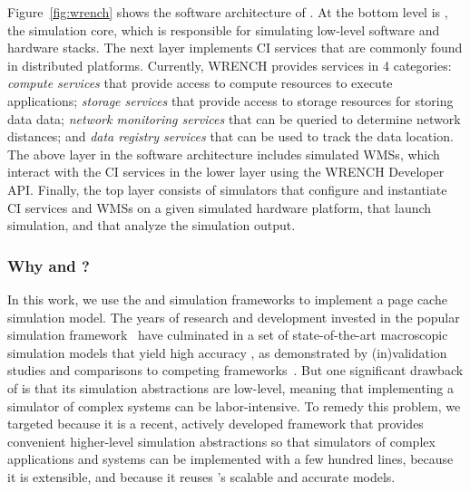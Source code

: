 Figure~\ref{fig:wrench} shows the software architecture of \wrench. 
At the bottom level is \simgrid, the simulation core, which is responsible for 
simulating low-level software and hardware stacks.
The next layer implements CI  services that are commonly
found in distributed platforms.
Currently, WRENCH provides services in 4 categories: 
\textit{compute services} that provide access to compute resources to 
execute applications; 
\textit{storage services} that provide access to storage resources for 
storing data data; 
\textit{network monitoring services} that can be queried to
determine network distances; and 
\textit{data registry services} that can be used to track the data location.
The above layer in the software architecture includes simulated WMSs, 
which interact with the CI services in the lower layer using the WRENCH 
Developer API.
Finally, the top layer consists of simulators that configure and instantiate 
CI services and WMSs on a given simulated hardware platform, that launch
simulation, and that analyze the simulation output.

\subsubsection{Why \simgrid and \wrench?}

In this work, we use the \simgrid and \wrench simulation
frameworks to implement a page cache simulation model.  
The years of research and development invested in
the popular \simgrid simulation framework~\cite{casanova2014simgrid} have
culminated in a set of state-of-the-art macroscopic simulation
models that yield high accuracy , as demonstrated by
(in)validation studies and comparisons to competing
frameworks~\cite{smpi_validity, velhoTOMACS2013, simutool_09,
nstools_07, lebre2015, pouilloux:hal-01197274,
smpi_tpds2017,  7885814, 8048921, 7384330}.  
But one significant drawback of \simgrid is that its simulation
abstractions are low-level, meaning that implementing a
simulator of complex systems can be labor-intensive. 
To remedy this problem, we targeted \wrench because it is a recent,
actively developed framework that provides convenient higher-level 
simulation abstractions so that simulators of complex applications and
systems can be implemented with a few hundred lines, because it is extensible, 
and because it reuses \simgrid's scalable and accurate models.